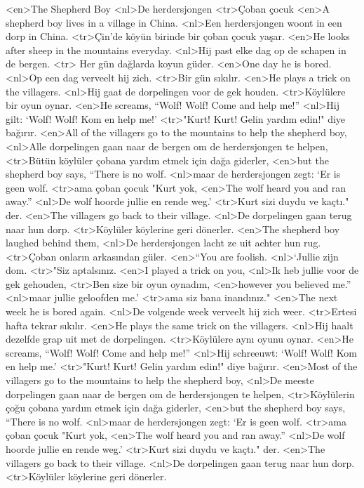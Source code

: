 <en>The Shepherd Boy
<nl>De herdersjongen
<tr>Çoban çocuk
<en>A shepherd boy lives in a village in China.
<nl>Een herdersjongen woont in een dorp in China.
<tr>Çin'de köyün birinde bir çoban çocuk yaşar.
<en>He  looks after  sheep in the mountains everyday.
<nl>Hij past elke dag op de schapen in de bergen.
<tr> Her gün dağlarda koyun güder.
<en>One day he is bored.
<nl>Op een dag verveelt hij zich.
<tr>Bir gün sıkılır.
<en>He plays a trick on the villagers.
<nl>Hij gaat de dorpelingen voor de gek houden.
<tr>Köylülere bir oyun oynar.
<en>He screams, “Wolf! Wolf! Come and help me!”
<nl>Hij gilt: `Wolf! Wolf! Kom en help me!'
<tr>"Kurt! Kurt! Gelin yardım edin!" diye bağırır.
<en>All of the villagers go to the mountains to help the shepherd boy,
<nl>Alle dorpelingen gaan naar de bergen om de herdersjongen te helpen,
<tr>Bütün köylüler çobana yardım etmek için dağa giderler,
<en>but the shepherd boy says, “There is no wolf.
<nl>maar de herdersjongen zegt: `Er is geen wolf.
<tr>ama çoban çocuk "Kurt yok,
<en>The wolf heard you and ran away.”
<nl>De wolf hoorde jullie en rende weg.'
<tr>Kurt sizi duydu ve kaçtı." der.
<en>The villagers go back to their village.
<nl>De dorpelingen gaan terug naar hun dorp.
<tr>Köylüler köylerine geri dönerler.
<en>The shepherd boy laughed behind them,
<nl>De herdersjongen lacht ze uit achter hun rug. 
<tr>Çoban onların arkasından güler.
<en>“You are foolish.
<nl>`Jullie zijn dom.
<tr>"Siz aptalsınız.
<en>I played a trick on you,
<nl>Ik heb jullie voor de gek gehouden,
<tr>Ben size bir oyun oynadım,
<en>however you believed me.”
<nl>maar jullie geloofden me.'
<tr>ama siz bana inandınız."
<en>The next week he is bored again.
<nl>De volgende week verveelt hij zich weer.
<tr>Ertesi hafta tekrar sıkılır.
<en>He plays the same trick on the villagers.
<nl>Hij haalt dezelfde grap uit met de dorpelingen.
<tr>Köylülere aynı oyunu oynar.
<en>He screams, “Wolf! Wolf! Come and help me!”
<nl>Hij schreeuwt: `Wolf! Wolf! Kom en help me.'
<tr>"Kurt! Kurt! Gelin yardım edin!" diye bağırır.
<en>Most  of the villagers go to the mountains to help the shepherd boy,
<nl>De meeste dorpelingen gaan naar de bergen om de herdersjongen te helpen,
<tr>Köylülerin çoğu çobana yardım etmek için dağa giderler,
<en>but the shepherd boy says, “There is no wolf.
<nl>maar de herdersjongen zegt: `Er is geen wolf.
<tr>ama çoban çocuk "Kurt yok,
<en>The wolf heard you and ran away.”
<nl>De wolf hoorde jullie en rende weg.'
<tr>Kurt sizi duydu ve kaçtı." der.
<en>The villagers go back to their village.
<nl>De dorpelingen gaan terug naar hun dorp.
<tr>Köylüler köylerine geri dönerler.
